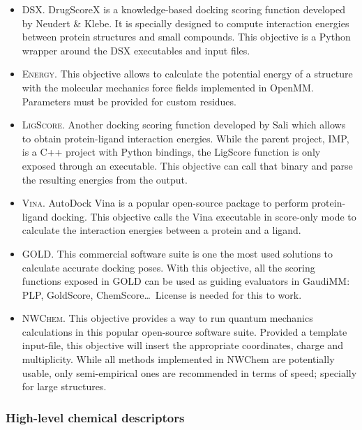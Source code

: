 \begin{itemize}
	\item \textsc{DSX}. DrugScoreX is a knowledge-based docking scoring function developed by Neudert $\&$  Klebe.\cite{neudert2011dsx} It is specially designed to compute interaction energies between protein structures and small compounds. This objective is a Python wrapper around the DSX executables and input files.

	\item \textsc{Energy}. This objective allows to calculate the potential energy of a structure with the molecular mechanics force fields implemented in OpenMM. Parameters must be provided for custom residues.

	\item \textsc{LigScore}. Another docking scoring function developed by Sali\cite{krammer2005ligscore} which allows to obtain protein-ligand interaction energies. While the parent project, IMP,\cite{russel2012putting} is a C++ project with Python bindings, the LigScore function is only exposed through an executable. This objective can call that binary and parse the resulting energies from the output.

	\item \textsc{Vina}. AutoDock Vina\cite{trott2010autodock} is a popular open-source package to perform protein-ligand docking. This objective calls the Vina executable in score-only mode to calculate the interaction energies between a protein and a ligand.

	\item \textsc{GOLD}. This commercial software suite is one the most used solutions to calculate accurate docking poses. With this objective, all the scoring functions exposed in GOLD\cite{gold} can be used as guiding evaluators in GaudiMM: PLP, GoldScore, ChemScore\ldots\ License is needed for this to work.

	\item \textsc{NWChem}. This objective provides a way to run quantum mechanics calculations in this popular open-source software suite.\cite{nwchem} Provided a template input-file, this objective will insert the appropriate coordinates, charge and multiplicity. While all methods implemented in NWChem are potentially usable, only semi-empirical ones are recommended in terms of speed; specially for large structures.


\end{itemize}\subsubsection{High-level chemical descriptors}
